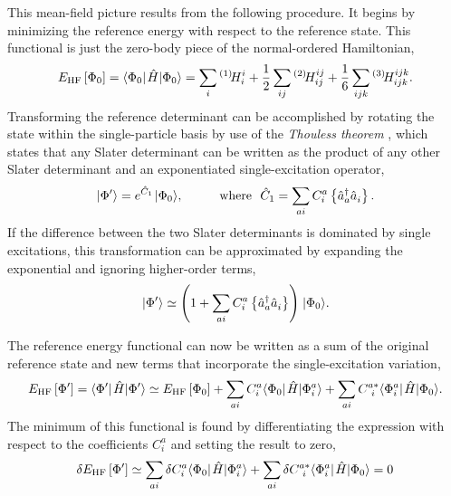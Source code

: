 \documentclass[thesis.tex]{subfiles}
\begin{document}
This mean-field picture results from the following procedure.  It begins by minimizing the reference energy with respect to the reference state.  This functional is just the zero-body piece of the normal-ordered Hamiltonian,
\begin{equation}
  E_{\text{HF}}\left[ \Ref \right] = \element{\Ref}{\Ham}{\Ref} = \sum_{\mathclap{i}}\Hint{1}{i}{i} + \frac{1}{2}\sum_{\mathclap{ij}}\Hint{2}{ij}{ij} + \frac{1}{6}\sum_{\mathclap{ijk}}\Hint{3}{ijk}{ijk}.
\end{equation}
Transforming the reference determinant can be accomplished by rotating the state within the single-particle basis by use of the \textit{Thouless theorem} \cite{THOULESS1960225}, which states that any Slater determinant can be written as the product of any other Slater determinant and an exponentiated single-excitation operator,
\begin{equation} \label{eq:thouless}
  \hspace{1pt}\lvert \Phi' \rangle = e^{\hat{C}_{1}}\hspace{1pt}\lvert \Phi_{0} \rangle, \hspace{1cm} \text{where\ \ } \hat{C}_{1} = \sum_{a i}C^{a}_{i}\left\{ \hat{a}_{a}^{\dagger}\hat{a}_{i}^{} \right\}.
\end{equation}
If the difference between the two Slater determinants is dominated by single excitations, this transformation can be approximated by expanding the exponential and ignoring higher-order terms,
\begin{equation} \label{eq:thouless_limit}
  \hspace{1pt}\lvert \Phi' \rangle \simeq \left( 1 + \sum_{a i}C^{a}_{i}\left\{ \hat{a}_{a}^{\dagger}\hat{a}_{i}^{} \right\} \right)\hspace{1pt}\lvert \Phi_{0} \rangle.
\end{equation}

The reference energy functional can now be written as a sum of the original reference state and new terms that incorporate the single-excitation variation,
\begin{equation} \label{eq:hf_thouless}
  E_{\text{HF}}\left[ \Phi' \right] = \element{\Phi'}{\Ham}{\Phi'} \simeq E_{\text{HF}}\left[ \Ref \right] + \sum_{a i}C^{a}_{i}\refbra\Ham\ket{\Phi^{a}_{i}} + \sum_{a i}C^{a*}_{\ i}\bra{\Phi^{a}_{i}}\Ham\refket.
\end{equation}
The minimum of this functional is found by differentiating the expression with respect to the coefficients $C^{a}_{i}$ and setting the result to zero,
\begin{equation} \label{eq:del_hf_thouless}
  \delta E_{\text{HF}}\left[ \Phi' \right] \simeq \sum_{a i}\delta C^{a}_{i}\refbra\Ham\ket{\Phi^{a}_{i}} + \sum_{a i}\delta C^{a*}_{\ i}\bra{\Phi^{a}_{i}}\Ham\refket = 0
\end{equation}
\end{document}
